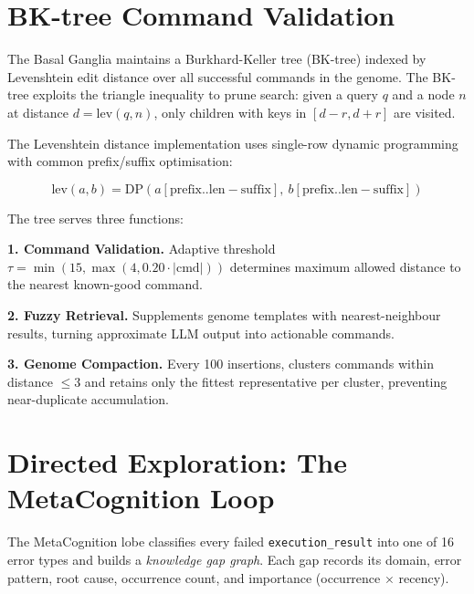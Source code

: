\documentclass[12pt,a4paper]{report}
\begin{document}
\section{BK-tree Command Validation}
The Basal Ganglia maintains a Burkhard-Keller tree (BK-tree) indexed by Levenshtein edit distance over all successful commands in the genome. The BK-tree exploits the triangle inequality to prune search: given a query $q$ and a node $n$ at distance $d = \text{lev}(q, n)$, only children with keys in $[d - r, d + r]$ are visited.

The Levenshtein distance implementation uses single-row dynamic programming with common prefix/suffix optimisation:

\begin{equation}
\text{lev}(a, b) = \text{DP}(a[\text{prefix}..\text{len}-\text{suffix}],\ b[\text{prefix}..\text{len}-\text{suffix}])
\end{equation}

The tree serves three functions:

\textbf{1. Command Validation.} Adaptive threshold $\tau = \min(15, \max(4, 0.20 \cdot |\text{cmd}|))$ determines maximum allowed distance to the nearest known-good command.

\textbf{2. Fuzzy Retrieval.} Supplements genome templates with nearest-neighbour results, turning approximate LLM output into actionable commands.

\textbf{3. Genome Compaction.} Every 100 insertions, clusters commands within distance $\leq 3$ and retains only the fittest representative per cluster, preventing near-duplicate accumulation.

\section{Directed Exploration: The MetaCognition Loop}
The MetaCognition lobe classifies every failed \texttt{execution\_result} into one of 16 error types and builds a \emph{knowledge gap graph}. Each gap records its domain, error pattern, root cause, occurrence count, and importance (occurrence $\times$ recency).
\end{document}
